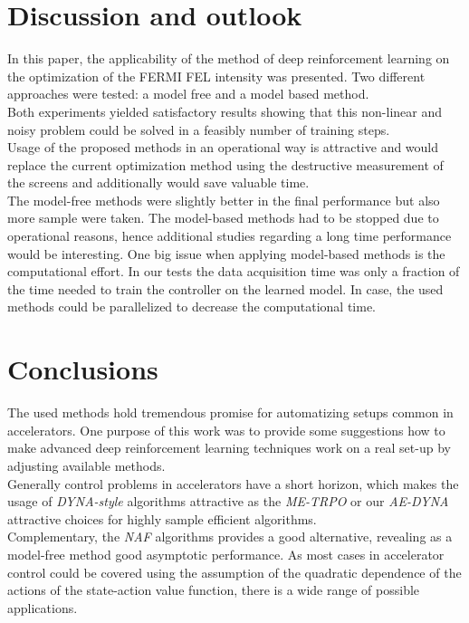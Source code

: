 \documentclass[
reprint,
amsmath,amssymb,amsfonts,clevref,
aps,
prstab,
]{revtex4-2}
\begin{document}
	\section{Discussion and outlook}
	In this paper, the applicability of the method of deep reinforcement learning on the optimization of the FERMI FEL intensity was presented. Two different approaches were tested: a model free and a model based method.\\
	 Both experiments yielded satisfactory results showing that this non-linear and noisy problem could be solved in a feasibly number of training steps.\\
	Usage of the proposed methods in an operational way is attractive and would replace the current optimization method using the destructive measurement of the screens and additionally would save valuable time.\\ 
	The model-free methods were slightly better in the final performance but also more sample were taken. The model-based methods had to be stopped due to operational reasons, hence additional studies regarding a long time performance would be interesting. One big issue when applying model-based methods is the computational effort. In our tests the data acquisition time was only a fraction of the time needed to train the controller on the learned model. In case, the used methods could be parallelized to decrease the computational time.
	
\section{Conclusions}
 The used methods hold tremendous promise for automatizing setups common in accelerators. One purpose of this work was to provide some suggestions how to make advanced deep reinforcement learning techniques work on a real set-up by adjusting available methods.\\
 Generally control problems in accelerators have a short horizon, which makes the usage of \emph{DYNA-style} algorithms attractive as the \emph{ME-TRPO} or our  \emph{AE-DYNA} attractive choices for highly sample efficient algorithms.\\
 Complementary, the \emph{NAF} algorithms provides a good alternative, revealing as a model-free method good asymptotic performance. As most cases in accelerator control could be covered using the assumption of the quadratic dependence of the actions of the state-action value function, there is a wide range of possible applications.\\
 
\end{document}
